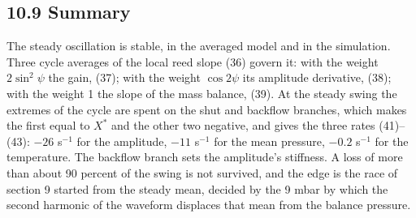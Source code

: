 \documentclass[11pt]{article}
\begin{document}
\subsection*{10.9 Summary}

The steady oscillation is stable, in the averaged model and in the simulation. Three cycle averages of the local reed slope (36) govern it: with the weight $2\sin^2\psi$ the gain, (37); with the weight $\cos 2\psi$ its amplitude derivative, (38); with the weight 1 the slope of the mass balance, (39). At the steady swing the extremes of the cycle are spent on the shut and backflow branches, which makes the first equal to $X^*$ and the other two negative, and gives the three rates (41)--(43): $-26$ s$^{-1}$ for the amplitude, $-11$ s$^{-1}$ for the mean pressure, $-0.2$ s$^{-1}$ for the temperature. The backflow branch sets the amplitude's stiffness. A loss of more than about 90 percent of the swing is not survived, and the edge is the race of section 9 started from the steady mean, decided by the 9 mbar by which the second harmonic of the waveform displaces that mean from the balance pressure.
\end{document}
